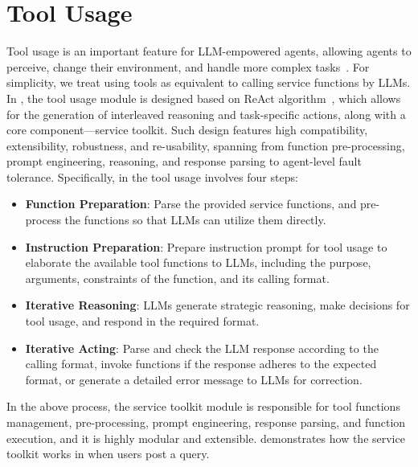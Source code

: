 \section{Tool Usage}
\label{sec:tools}
Tool usage is an important feature for LLM-empowered agents, allowing agents to perceive, change their environment, and handle more complex tasks~\citep{auto-gen,art,talm}. 
For simplicity, we treat using tools as equivalent to calling service functions by LLMs. 
In \ours, the tool usage module is designed based on ReAct algorithm~\citep{react}, which allows for the generation of interleaved reasoning and task-specific actions, along with a core component---service toolkit. 
Such design features high compatibility, extensibility, robustness, and re-usability, spanning from function pre-processing, prompt engineering, reasoning, and response parsing to agent-level fault tolerance. 
Specifically, in \ours the tool usage involves four steps:

\begin{itemize}
	\item \textbf{Function Preparation}: 
	Parse the provided service functions, and pre-process the functions so that LLMs can utilize them directly. 
	
	\item \textbf{Instruction Preparation}: 
	Prepare instruction prompt for tool usage to elaborate the available tool functions to LLMs, including the purpose, arguments, constraints of the function, and its calling format. 
	
	\item \textbf{Iterative Reasoning}: 
	LLMs generate strategic reasoning, make decisions for tool usage, and respond in the required format. 
	
	\item \textbf{Iterative Acting}: 
	Parse and check the LLM response according to the calling format, invoke functions if the response adheres to the expected format, or generate a detailed error message to LLMs for correction. 

\end{itemize}

In the above process, the service toolkit module is responsible for tool functions management, pre-processing, prompt engineering, response parsing, and function execution, and it is highly modular and extensible. 
 demonstrates how the service toolkit works in \ours when users post a query. 


